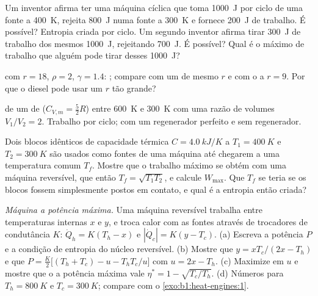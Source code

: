 \begin{exercise}[$\star\star$]\label{exo:b1:heat-engines:6}
Um inventor afirma ter uma máquina cíclica que toma \qty{1000}{J} por ciclo
de uma fonte a \qty{400}{K}, rejeita \qty{800}{J} numa fonte a
\qty{300}{K} e fornece \qty{200}{J} de trabalho. É possível? Entropia criada
por ciclo. Um segundo inventor afirma tirar \qty{300}{J} de trabalho dos mesmos
\qty{1000}{J}, rejeitando \qty{700}{J}. É possível? Qual é o máximo de
trabalho que alguém pode tirar desses \qty{1000}{J}?
\end{exercise}

\begin{exercise}[$\star\star$]\label{exo:b1:heat-engines:7}
 com $r = 18$, $\rho = 2$, $\gamma = 1.4$: ;
compare com um  de mesmo $r$ e com o  a
$r = 9$. Por que o diesel pode usar um $r$ tão grande?
\end{exercise}

\begin{exercise}[$\star\star$]\label{exo:b1:heat-engines:8}
 de um  de  ($C_{V,m} = \tfrac52R$) entre
\qty{600}{K} e \qty{300}{K} com uma razão de volumes $V_1/V_2 = 2$. Trabalho
por ciclo;  com um regenerador perfeito e sem regenerador.
\end{exercise}

\begin{exercise}[$\star\star$]\label{exo:b1:heat-engines:9}
Dois blocos idênticos de capacidade térmica $C = \qty{4.0}{kJ/K}$ a $T_1 =
\qty{400}{K}$ e $T_2 = \qty{300}{K}$ são usados como fontes de uma máquina
até chegarem a uma temperatura comum $T_f$. Mostre que o trabalho máximo
se obtém com uma máquina reversível, que então $T_f = \sqrt{T_1T_2}$, e
calcule $W_{\max}$. Que $T_f$ se teria se os blocos fossem simplesmente
postos em contato, e qual é a entropia então criada?
\end{exercise}

\begin{exercise}[$\star\star\star$]\label{exo:b1:heat-engines:10}
\emph{Máquina a potência máxima.} Uma máquina reversível trabalha entre
temperaturas internas $x$ e $y$, e troca calor com as fontes
através de trocadores de condutância $K$: $\dot Q_h = K(T_h - x)$ e
$|\dot Q_c| = K(y - T_c)$. (a) Escreva a potência $P$ e a condição de
entropia do núcleo reversível. (b) Mostre que $y = xT_c/(2x - T_h)$ e
que $P = \frac{K}{2}\bigl[(T_h + T_c) - u - T_hT_c/u\bigr]$ com $u = 2x - T_h$.
(c) Maximize em $u$ e mostre que o  a potência máxima vale
$\eta^\ast = 1 - \sqrt{T_c/T_h}$. (d) Números para $T_h = \qty{800}{K}$ e
$T_c = \qty{300}{K}$; compare com o \cref{exo:b1:heat-engines:1}.
\end{exercise}

